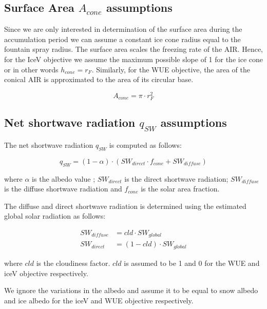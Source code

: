 \documentclass[tc, manuscript]{copernicus}
\begin{document}
\subsection{Surface Area $A_{cone}$ assumptions}

Since we are only interested in determination of the surface area during the accumulation period we can assume a
constant ice cone radius equal to the fountain spray radius. The surface area scales the freezing rate of the
AIR. Hence, for the IceV objective we assume the maximum possible slope of 1 for the ice cone or in other words
$h_{cone} = r_{F}$. Similarly, for the WUE objective, the area of the conical AIR is
approximated to the area of its circular base. 

\begin{equation} A_{cone} =\pi \cdot r_{F}^2 \label{eq:Area} \end{equation}

\subsection{Net shortwave radiation \texorpdfstring{$q_{SW}$}{Lg} assumptions}
\label{sec:SW}

The net shortwave radiation $q_{SW}$ is computed as follows:

\begin{equation} q_{SW} = (1- \alpha) \cdot ( SW_{direct} \cdot f_{cone} + SW_{diffuse})
\label{eqn:SW} \end{equation}

where $\alpha$ is the albedo value ; $SW_{direct}$ is the direct shortwave radiation; $SW_{diffuse}$ is the
diffuse shortwave radiation and $f_{cone}$ is the solar area fraction.

The diffuse and direct shortwave radiation is determined using the estimated global solar radiation as follows:

\begin{equation}
\begin{split}
  SW_{diffuse} &= cld \cdot SW_{global}\\
  SW_{direct} &= (1-cld) \cdot SW_{global}
\end{split}
\end{equation}

where $cld$ is the cloudiness factor. $cld$ is assumed to be 1 and 0 for the WUE and iceV objective
respectively.

We ignore the variations in the albedo and assume it to be equal to snow albedo and ice albedo for the iceV and
WUE objective respectively. 
\end{document}
